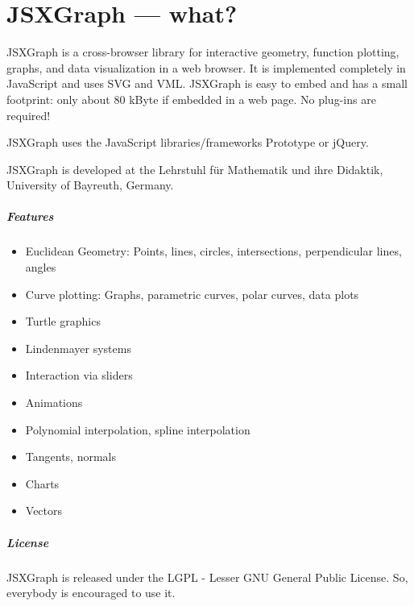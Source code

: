 \documentclass[a4paper]{tufte-book}
\begin{document}
\mainmatter

\chapter{JSXGraph --- what?}
\label{ch:what}


JSXGraph is a cross-browser library for interactive geometry, function plotting, graphs, and data visualization in a web browser. It is implemented completely in JavaScript and uses SVG and VML.
JSXGraph is easy to embed and has a small footprint: only about 80 kByte if embedded in a web page. No plug-ins are required! 

JSXGraph uses the JavaScript libraries/frameworks Prototype or jQuery.

JSXGraph is developed at the Lehrstuhl f\"ur Mathematik und ihre Didaktik, University of Bayreuth, Germany.


\paragraph{Features}
\begin{itemize}
    \item Euclidean Geometry: Points, lines, circles, intersections, perpendicular lines, angles
    \item  Curve plotting: Graphs, parametric curves, polar curves, data plots
    \item  Turtle graphics
    \item  Lindenmayer systems
    \item  Interaction via sliders
    \item  Animations
    \item  Polynomial interpolation, spline interpolation
    \item  Tangents, normals
    \item  Charts
    \item  Vectors
\end{itemize}

\paragraph{License}

JSXGraph is released under the LGPL - Lesser GNU General Public License. So, everybody is encouraged to use it.
\end{document}
